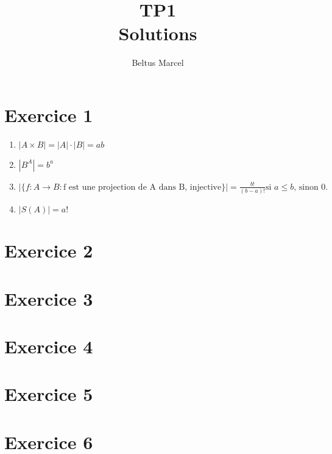 \documentclass[fontsize=10pt]{article}
\title{\textbf{TP1}\\ Solutions}
\author{Beltus Marcel}
\date{}
\begin{document}
\maketitle %


\section*{Exercice 1}
\begin{enumerate}
\item $|A\times B | = |A|\cdot|B|=ab$
\item $|B^A|=b^a$
\item $|\{f:A \rightarrow B : \text{f est une projection de A dans B, injective}\}| = \frac{b!}{(b-a)!}\text{si $a \leq b$, sinon 0.}$
\item $|S(A)| = a!$
\end{enumerate}
\section*{Exercice 2}

\section*{Exercice 3}

\section*{Exercice 4}
\section*{Exercice 5}
\section*{Exercice 6}
\end{document}
